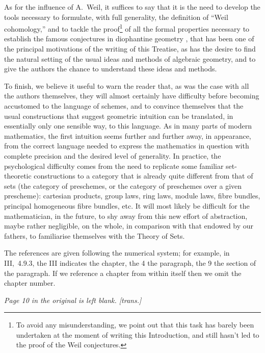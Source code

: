 \documentclass{book}
\begin{document}
As for the influence of A.~Weil, it suffices to say that it is the need to
develop the tools necessary to formulate, with full generality, the definition
of ``Weil cohomology,'' and to tackle the proof\footnote{To avoid any
misunderstanding, we point out that this task has barely been undertaken at the
moment of writing this Introduction, and still hasn't led to the proof of the
Weil conjectures.} of all the formal properties necessary to establish the
famous conjectures in diophantine geometry \cite{19}, that has been one of the
principal motivations of the writing of this Treatise, as has the desire to find
the natural setting of the usual ideas and methods of algebraic geometry, and to
give the authors the chance to understand these ideas and methods.

\asttri

To finish, we believe it useful to warn the reader that, as was the case with
all the authors themselves, they will almost certainly have difficulty before
becoming accustomed to the language of schemes, and to convince themselves that
the usual constructions that suggest geometric intuition can be translated, in
essentially only one sensible way, to this language. As in many parts of modern
mathematics, the first intuition seems further and further away, in appearance,
from the correct language needed to express the mathematics in question with
complete precision and the desired level of generality. In practice, the
psychological difficulty comes from the need to replicate some familiar
set-theoretic constructions to a category that is already quite different from
that of sets (the category of preschemes, or the category of preschemes over a
given prescheme): cartesian products, group laws, ring laws, module laws, fibre
bundles, principal homogeneous fibre bundles, etc. It will most likely
be difficult for the mathematician, in the future, to shy away from this new
effort of abstraction, maybe rather negligible, on the whole, in comparison with
that endowed by our fathers, to familiarise themselves with the Theory of Sets.

\asttri

The references are given following the numerical system; for example, in
III,~4.9.3, the III indicates the chapter, the 4 the paragraph, the 9 the
section of the paragraph. If we reference a chapter from within itself then we
omit the chapter number.

\bigskip

\emph{Page 10 in the original is left blank. [trans.]}
\end{document}
